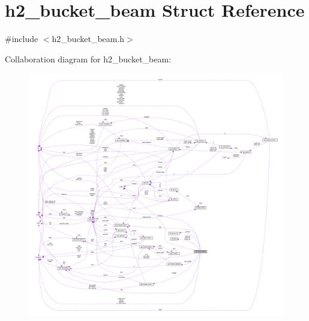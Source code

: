 \hypertarget{structh2__bucket__beam}{}\section{h2\+\_\+bucket\+\_\+beam Struct Reference}
\label{structh2__bucket__beam}


{\ttfamily \#include $<$h2\+\_\+bucket\+\_\+beam.\+h$>$}



Collaboration diagram for h2\+\_\+bucket\+\_\+beam\+:
\nopagebreak
\begin{figure}[H]
\begin{center}
\leavevmode
\includegraphics[width=350pt]{structh2__bucket__beam__coll__graph}
\end{center}
\end{figure}
